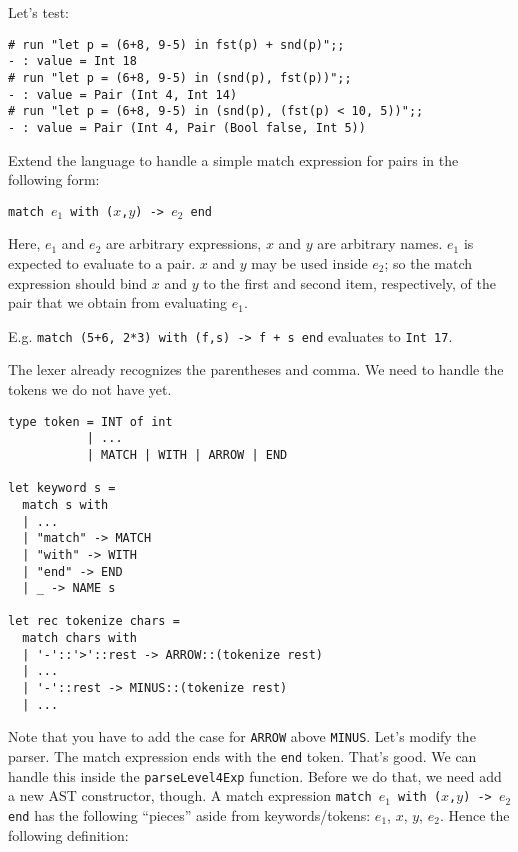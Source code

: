 \documentclass[addpoints]{exam}
\begin{document}
\begin{questions}
\begin{solution}
    
    Let's test:
    \begin{verbatim}
# run "let p = (6+8, 9-5) in fst(p) + snd(p)";;
- : value = Int 18
# run "let p = (6+8, 9-5) in (snd(p), fst(p))";;
- : value = Pair (Int 4, Int 14)
# run "let p = (6+8, 9-5) in (snd(p), (fst(p) < 10, 5))";;
- : value = Pair (Int 4, Pair (Bool false, Int 5))
    \end{verbatim}
  \end{solution}

  
  \question
  Extend the language to handle
  a simple match expression for pairs in the following form:

  \texttt{match $e_1$ with ($x$,$y$) -> $e_2$ end}

  Here, $e_1$ and $e_2$ are arbitrary expressions,
  $x$ and $y$ are arbitrary names.
  $e_1$ is expected to evaluate to a pair.
  $x$ and $y$ may be used
  inside $e_2$; so the match expression should bind
  $x$ and $y$ to the first and second item, respectively,
  of the pair that we obtain from evaluating $e_1$.

  E.g. \texttt{match (5+6, 2*3) with (f,s) -> f + s end}
  evaluates to \texttt{Int 17}.

  \begin{solution}
    The lexer already recognizes the parentheses and comma.
    We need to handle the tokens we do not have yet.

    \begin{verbatim}
type token = INT of int
           | ...
           | MATCH | WITH | ARROW | END

let keyword s =
  match s with
  | ...
  | "match" -> MATCH
  | "with" -> WITH
  | "end" -> END
  | _ -> NAME s
  
let rec tokenize chars =
  match chars with
  | '-'::'>'::rest -> ARROW::(tokenize rest)
  | ...
  | '-'::rest -> MINUS::(tokenize rest)
  | ...
    \end{verbatim}

    Note that you have to add the case for \texttt{ARROW} above \texttt{MINUS}.
    Let's modify the parser. The match expression ends with the \texttt{end} token.
    That's good. We can handle this inside the \texttt{parseLevel4Exp} function.
    Before we do that, we need add a new AST constructor, though.
    A match expression \texttt{match $e_1$ with ($x$,$y$) -> $e_2$ end}
    has the following ``pieces'' aside from keywords/tokens: $e_1$, $x$, $y$, $e_2$.
    Hence the following definition:


\end{solution}
\end{questions}
\end{document}

